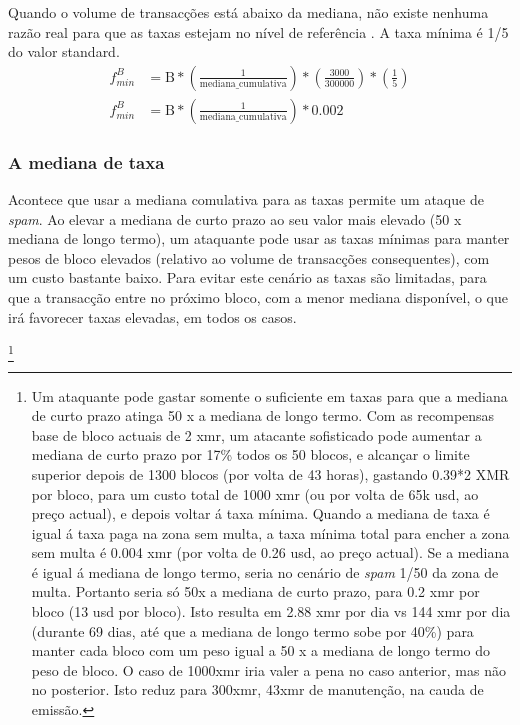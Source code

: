 Quando o volume de transacções está abaixo da mediana, não existe nenhuma razão real para que as taxas estejam no nível de referência \cite{jollymore-old-analysis}. A taxa mínima é 1/5 do valor standard.
\vspace{.175cm}
\begin{align*}
    f^{B}_{min} &= \textrm{B}*(\frac{1}{\textrm{mediana\_cumulativa}}) * (\frac{3000}{300000}) * (\frac{1}{5})\\
    f^{B}_{min} &= \textrm{B}*(\frac{1}{\textrm{mediana\_cumulativa}}) * 0.002
\end{align*}{}

\subsubsection*{A mediana de taxa}

Acontece que usar a mediana comulativa para as taxas permite um ataque de {\em spam}.
Ao elevar a mediana de curto prazo ao seu valor mais elevado (50 x mediana de longo termo), um ataquante pode usar as taxas mínimas para manter pesos de bloco elevados (relativo ao volume de transacções consequentes), com um custo bastante baixo. 
Para evitar este cenário as taxas são limitadas, para que a transacção entre no próximo bloco, com a menor mediana disponível, o que irá favorecer taxas elevadas, em todos os casos. 

\footnote{Um ataquante pode gastar somente o suficiente em taxas para que a mediana de curto prazo atinga 50 x a mediana de longo termo. Com as recompensas base de bloco actuais de 2 xmr, um atacante sofisticado pode aumentar a mediana de curto prazo por 17\% todos os 50 blocos, e alcançar o limite superior depois de 1300 blocos (por volta de 43 horas), gastando 0.39*2 XMR por bloco, para um custo total de 1000 xmr (ou por volta de 65k usd, ao preço actual), e depois voltar á taxa mínima. Quando a mediana de taxa é igual á taxa paga na zona sem multa, a taxa mínima total para encher a zona sem multa é 0.004 xmr (por volta de 0.26 usd, ao preço actual). Se a mediana é igual á mediana de longo termo, seria no cenário de {\em spam} 1/50 da zona de multa. Portanto seria só 50x a mediana de curto prazo, para 0.2 xmr por bloco (13 usd por bloco). Isto resulta em 2.88 xmr por dia vs 144 xmr por dia (durante 69 dias, até que a mediana de longo termo sobe por 40\%) para manter cada bloco com um peso igual a 50 x a mediana de longo termo do peso de bloco. O caso de 1000xmr iria valer a pena no caso anterior, mas não no posterior. Isto reduz para 300xmr, 43xmr de manutenção, na cauda de emissão.}\vspace{.1cm}   

